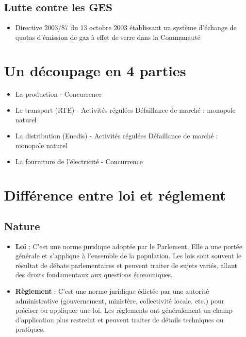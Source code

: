 \subsection{Lutte contre les GES}
\begin{itemize}
    \item Directive 2003/87 du 13 octobre 2003 établissant un système d’échange de quotas d’émission de gaz à effet de serre dans la Communauté
\end{itemize}
\section{Un découpage en 4 parties}
\begin{itemize}
    \item La production - Concurrence
    \item Le transport (RTE) - Activités régulées \textcolor{BrickRed}{Défaillance de marché : monopole naturel}
    \item La distribution (Enedis) - Activités régulées \textcolor{BrickRed}{Défaillance de marché : monopole naturel}
    \item La fourniture de l'électricité - Concurrence
\end{itemize}
\newpage
\section{Différence entre loi et réglement}
\subsection{Nature}
\begin{itemize}
    \item \textbf{Loi} : C'est une norme juridique adoptée par le Parlement. Elle a une portée générale et s'applique à l'ensemble de la population. Les lois sont souvent le résultat de débats parlementaires et peuvent traiter de sujets variés, allant des droits fondamentaux aux questions économiques.
    \item \textbf{Règlement} : C'est une norme juridique édictée par une autorité administrative (gouvernement, ministère, collectivité locale, etc.) pour préciser ou appliquer une loi. Les règlements ont généralement un champ d'application plus restreint et peuvent traiter de détails techniques ou pratiques.
\end{itemize}
